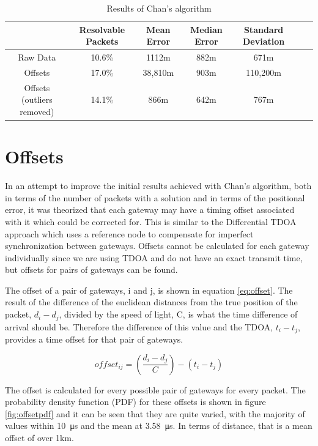 \documentclass[a4paper]{report}
\begin{document}
    \begin{table}[ht]
      \begin{center}
        \caption{Results of Chan's algorithm}
        \label{tab:chanresults}
        \begin{tabular}{|c|c|c|c|c|c|c|}
          \hline
           & Resolvable Packets & Mean Error & Median Error & Standard Deviation \\
          \hline
          Raw Data & 10.6\% & 1112m & 882m & 671m \\
          \hline
          Offsets & 17.0\% & 38,810m & 903m & 110,200m \\
          \hline
          Offsets (outliers removed) & 14.1\% & 866m & 642m & 767m \\
          \hline
        \end{tabular}
      \end{center}
    \end{table}

  \section{Offsets}

    In an attempt to improve the initial results achieved with Chan's algorithm, both in terms of the number of packets with a solution and in terms of the positional error, it was theorized that each gateway may have a timing offset associated with it which could be corrected for. This is similar to the Differential TDOA approach \cite{Li2014} which uses a reference node to compensate for imperfect synchronization between gateways. Offsets cannot be calculated for each gateway individually since we are using TDOA and do not have an exact transmit time, but offsets for pairs of gateways can be found.

    The offset of a pair of gateways, i and j, is shown in equation \ref{eq:offset}. The result of the difference of the euclidean distances from the true position of the packet, \(d_i - d_j\), divided by the speed of light, C, is what the time difference of arrival should be. Therefore the difference of this value and the TDOA, \(t_i - t_j\), provides a time offset for that pair of gateways.

    \begin{equation}
    \label{eq:offset}
    offset_{ij} = (\frac{d_i - d_j}{C}) - (t_i - t_j)
    \end{equation}

    The offset is calculated for every possible pair of gateways for every packet. The probability density function (PDF) for these offsets is shown in figure \ref{fig:offsetpdf} and it can be seen that they are quite varied, with the majority of values within \SI{10}{\micro\second} and the mean at \SI{3.58}{\micro\second}. In terms of distance, that is a mean offset of over 1km.
\end{document}
